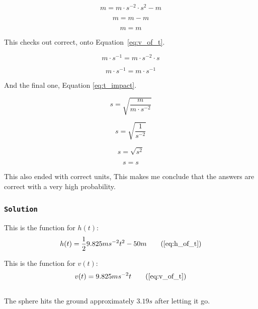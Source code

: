 \documentclass{article}
\let\oldsubsubsection\subsubsection
\renewcommand{\subsubsection}[1]{%
  \oldsubsubsection{\texttt{#1}}%
}
\begin{document}
\begin{equation*}
    m = m \cdot s^{-2} \cdot s^2 - m
\end{equation*}

\begin{equation*}
    m = m - m
\end{equation*}

\begin{equation*}
    m = m
\end{equation*}

This checks out correct, onto Equation~\ref{eq:v_of_t}.

\begin{equation*}
    m \cdot s^{-1} = m \cdot s^{-2} \cdot s
\end{equation*}

\begin{equation*}
    m \cdot s^{-1} = m \cdot s^{-1}
\end{equation*}

\clearpage

And the final one, Equation \ref{eq:t_impact}.

\begin{equation*}
    s = \sqrt{\frac{m}{m \cdot s^{-2}}}
\end{equation*}

\begin{equation*}
    s = \sqrt{\frac{1}{s^{-2}}}
\end{equation*}

\begin{equation*}
    s = \sqrt{s^2}
\end{equation*}

\begin{equation*}
    s = s
\end{equation*}

This also ended with correct units, This makes me conclude that the answers are correct with a very high probability.

\subsubsection{Solution}
This is the function for \(h(t)\):
\begin{equation*}
    h(t) =\frac{1}{2}9.825ms^{-2}t^2-50m
    \tag{\ref{eq:h_of_t}}
\end{equation*}

This is the function for \(v(t)\):
\begin{equation*}
    v(t) = 9.825ms^{-2}t
    \tag{\ref{eq:v_of_t}}
\end{equation*}
\\The sphere hits the ground approximately \(3.19s\) after letting it go.
\end{document}
